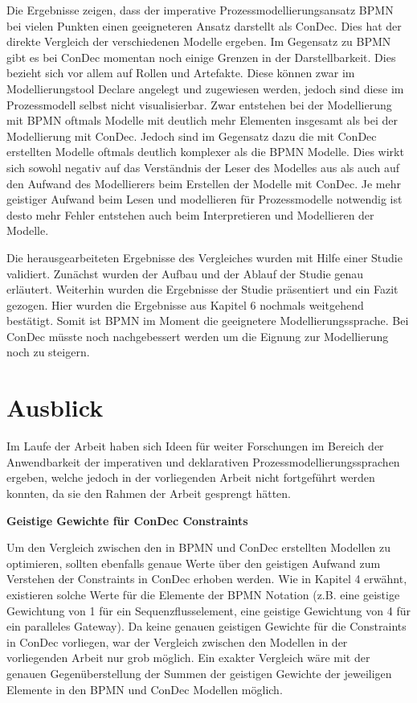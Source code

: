 Die Ergebnisse zeigen, dass der imperative Prozessmodellierungsansatz BPMN bei vielen Punkten einen geeigneteren Ansatz darstellt als ConDec. Dies hat der direkte Vergleich der verschiedenen Modelle ergeben. Im Gegensatz zu BPMN gibt es bei ConDec momentan noch einige Grenzen in der Darstellbarkeit. Dies bezieht sich vor allem auf Rollen und Artefakte. Diese können zwar im Modellierungstool Declare angelegt und zugewiesen werden, jedoch sind diese im Prozessmodell selbst nicht visualisierbar. Zwar entstehen bei der Modellierung mit BPMN oftmals Modelle mit deutlich mehr Elementen insgesamt als bei der Modellierung mit ConDec. Jedoch sind im Gegensatz dazu die mit ConDec erstellten Modelle oftmals deutlich komplexer als die BPMN Modelle. Dies wirkt sich sowohl negativ auf das Verständnis der Leser des Modelles aus als auch auf den Aufwand des Modellierers beim Erstellen der Modelle mit ConDec. Je mehr geistiger Aufwand beim Lesen und modellieren für Prozessmodelle notwendig ist desto mehr Fehler entstehen auch beim Interpretieren und Modellieren der Modelle. \newline

Die herausgearbeiteten Ergebnisse des Vergleiches wurden mit Hilfe einer Studie validiert. Zunächst wurden der Aufbau und der Ablauf der Studie genau erläutert. Weiterhin wurden die Ergebnisse der Studie präsentiert und ein Fazit gezogen. Hier wurden die Ergebnisse aus Kapitel 6 nochmals weitgehend bestätigt. Somit ist BPMN im Moment die geeignetere Modellierungssprache. Bei ConDec müsste noch nachgebessert werden um die Eignung zur Modellierung noch zu steigern.\newline


\section{Ausblick}

Im Laufe der Arbeit haben sich Ideen für weiter Forschungen im Bereich der Anwendbarkeit der imperativen und deklarativen Prozessmodellierungssprachen ergeben, welche jedoch in der vorliegenden Arbeit nicht fortgeführt werden konnten, da sie den Rahmen der Arbeit gesprengt hätten.\newline

\textbf{Geistige Gewichte für ConDec Constraints}

Um den Vergleich zwischen den in BPMN und ConDec erstellten Modellen zu optimieren, sollten ebenfalls genaue Werte über den geistigen Aufwand zum Verstehen der Constraints in ConDec erhoben werden. Wie in Kapitel 4 erwähnt, existieren solche Werte für die Elemente der BPMN Notation (z.B. eine geistige Gewichtung von 1 für ein Sequenzflusselement, eine geistige Gewichtung von 4 für ein paralleles Gateway). Da keine genauen geistigen Gewichte für die Constraints in ConDec vorliegen, war der Vergleich zwischen den Modellen in der vorliegenden Arbeit nur grob möglich. Ein exakter Vergleich wäre mit der genauen Gegenüberstellung der Summen der geistigen Gewichte der jeweiligen Elemente in den BPMN und ConDec Modellen möglich.\newline

